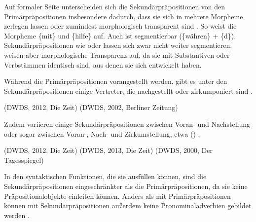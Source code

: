 Auf formaler Seite unterscheiden sich die Sekundärpräpositionen von den Primärpräpositionen insbesondere dadurch, dass sie sich in mehrere Morpheme zerlegen lassen oder zumindest morphologisch transparent sind \citep[s.][62]{DiMeola2001}. 
So weist  die Morpheme \{mit\} und \{hilfe\} auf. 
Auch  ist segmentierbar (\{währen\} + \{d\}). 
Sekundärpräpositionen wie  oder  lassen sich zwar nicht weiter segmentieren, weisen aber morphologische Transparenz auf, da sie mit Substantiven oder Verbstämmen identisch sind, aus denen sie sich entwickelt haben. 

Während die Primärpräpositionen vorangestellt werden, gibt es unter den Sekundärpräpositionen einige Vertreter, die nachgestellt oder zirkumponiert sind \citep[s.][152]{DiMeola2000}.
\begin{exe}
\ex {} (DWDS, 2012, Die Zeit)
\ex {} (DWDS, 2002, Berliner Zeitung)
\end{exe}
Zudem variieren einige Sekundärpräpositionen zwischen Voran- und Nachstellung oder sogar zwischen Voran-, Nach- und Zirkumstellung, etwa () . 
\begin{exe}
\ex {} (DWDS, 2012, Die Zeit)
\ex {} (DWDS, 2013, Die Zeit) 
\ex {} (DWDS, 2000, Der Tagesspiegel)
\end{exe}
In den syntaktischen Funktionen, die sie ausfüllen können, sind die Sekundärpräpositionen eingeschränkter als die Primärpräpositionen, da sie keine Präpositionalobjekte einleiten können. 
Anders als mit Primärpräpositionen können mit Sekundärpräpositionen außerdem keine Pronominaladverbien gebildet werden \citep[s.][526]{Eisenberg1979}.  

